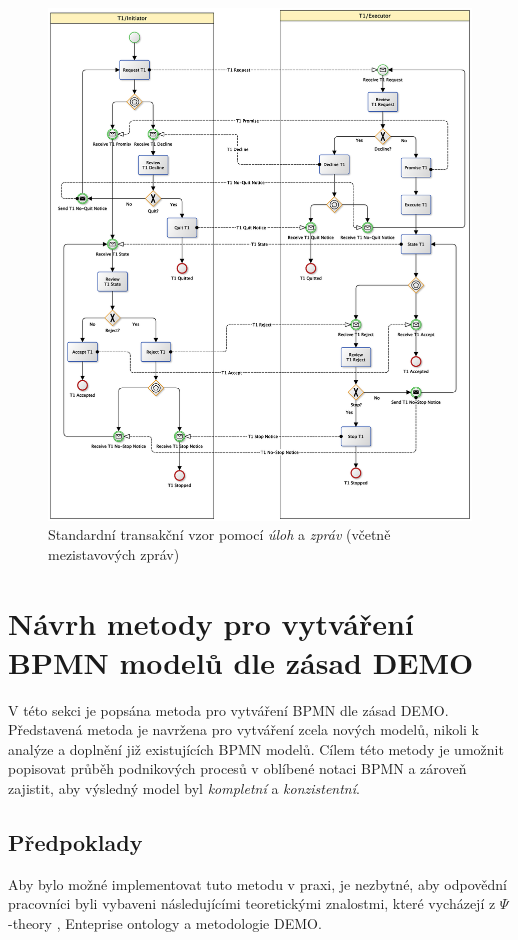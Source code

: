 \documentclass[]{article}
\newcommand{\ptheory}{$\Psi$-theory }
\begin{document}
\begin{figure}[H]\centering
\includegraphics[width=\textwidth,height=\textheight,keepaspectratio]{obrazky/transaction-standard-messages}
\caption{Standardní transakční vzor pomocí \textit{úloh} a \textit{zpráv} (včetně mezistavových zpráv)}
\label{fig:St_trans_ulohy_zpravy_mezistav}
\end{figure}

\section{Návrh metody pro vytváření BPMN modelů dle zásad DEMO}
V této sekci je popsána metoda pro vytváření BPMN dle zásad DEMO. Představená metoda je navržena pro vytváření zcela nových modelů, nikoli k analýze a doplnění již existujících BPMN modelů. Cílem této metody je umožnit popisovat průběh podnikových procesů v oblíbené notaci BPMN a zároveň zajistit, aby výsledný model byl \textit{kompletní} a \textit{konzistentní}.

\subsection{Předpoklady}
Aby bylo možné implementovat tuto metodu v praxi, je nezbytné, aby odpovědní pracovníci byli vybaveni následujícími teoretickými znalostmi, které vycházejí z \ptheory, Enteprise ontology a metodologie DEMO.
\end{document}
